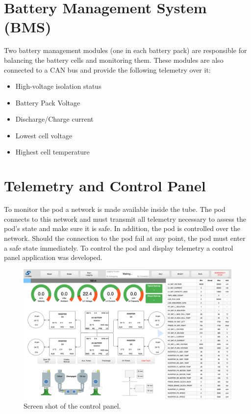 \section{Battery Management System (BMS)}

Two battery management modules (one in each battery pack) are responsible for balancing the battery cells and monitoring them. These modules are also connected to a CAN bus and provide the following telemetry over it:

\begin{itemize}
    \item High-voltage isolation status
    \item Battery Pack Voltage
    \item Discharge/Charge current
    \item Lowest cell voltage
    \item Highest cell temperature
\end{itemize}

\section{Telemetry and Control Panel}

To monitor the pod a network is made available inside the tube. The pod connects to this network and must transmit all telemetry necessary to assess the pod's state and make sure it is safe. In addition, the pod is controlled over the network. Should the connection to the pod fail at any point, the pod must enter a safe state immediately. To control the pod and display telemetry a control panel application was developed.

\begin{figure}[H]
  \centering \includegraphics[width=1.0\textwidth]{./figures/Screen_Shot_Control_Panel.png}
  \caption{Screen shot of the control panel.}
\end{figure}

